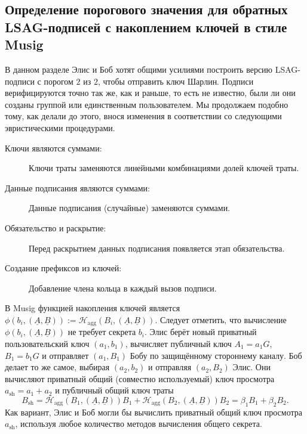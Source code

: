 \documentclass{mrl}
\theoremstyle{definition}
\numberwithin{theorem}{subsection}
\begin{document}
\subsection{Определение порогового значения для обратных LSAG-подписей с накоплением ключей в стиле Musig} \label{naiveImplement}

В данном разделе Элис и Боб хотят общими усилиями построить версию LSAG-подписи с порогом $2$ из $2$, чтобы отправить ключ Шарлин. Подписи верифицируются точно так же, как и раньше, то есть не известно, были ли они созданы группой или единственным пользователем. Мы продолжаем подобно тому, как делали до этого, внося изменения в соответствии со следующими эвристическими процедурами.
\begin{description}
\item [Ключи являются суммами:] Ключи траты заменяются линейными комбинациями долей ключей траты.

\item [Данные подписания являются суммами:] Данные подписания (случайные) заменяются суммами.

\item [Обязательство и раскрытие:] Перед раскрытием данных подписания появляется этап обязательства.

\item [Создание префиксов из ключей:] Добавление члена кольца в каждый вызов подписи.
\end{description}

В Musig функцией накопления ключей является $\phi(b_i, (\underline{A},\underline{B})) := \mathcal{H}_{\text{agg}}(B_i, (\underline{A}, \underline{B}))$. Следует отметить, что вычисление $\phi(b_i, (\underline{A}, \underline{B}))$ не требует секрета $b_i$. Элис берёт новый приватный пользовательский ключ $(a_1, b_1)$, вычисляет публичный ключ $A_1 = a_1 G$, $B_1 = b_1G$ и отправляет $(a_1, B_1)$ Бобу по защищённому стороннему каналу. Боб делает то же самое, выбирая $(a_2, b_2)$ и отправляя $(a_2, B_2)$ Элис. Они вычисляют приватный общий (совместно используемый) ключ просмотра $a_{\text{sh}} = a_1 + a_2$ и публичный общий ключ траты \[B_{\text{sh}} = \mathcal{H}_{\text{agg}}(B_1, (\underline{A}, \underline{B}))B_1 + \mathcal{H}_{\text{agg}}(B_2, (\underline{A}, \underline{B}))B_2 = \beta_1 B_1 + \beta_2 B_2.\] Как вариант, Элис и Боб могли бы вычислить приватный общий ключ просмотра $a_{\text{sh}}$, используя любое количество методов вычисления общего секрета.
\end{document}
